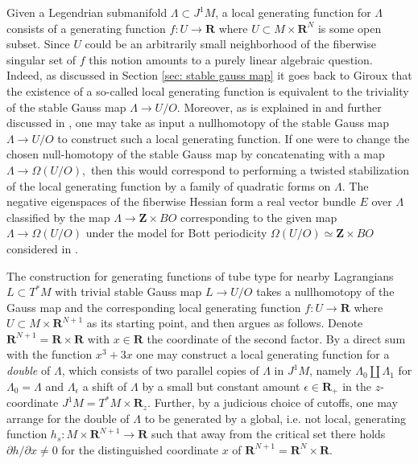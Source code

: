 \documentclass{amsart}
\def\bR{\mathbf{R}}
\def\bZ{\mathbf{Z}}
\theoremstyle{definition}
\theoremstyle{remark}
\newtheorem{inductive lemma}[theorem]{Inductive Lemma}
\begin{document}
Given a Legendrian submanifold $\Lambda \subset J^1M$, a local generating function for $\Lambda$ consists of a generating function $f:U \to \bR$ where $U \subset M \times \bR^N$ is some open subset. Since $U$ could be an arbitrarily small neighborhood of the fiberwise singular set of $f$ this notion amounts to a purely linear algebraic question. Indeed, as discussed in Section \ref{sec: stable gauss map} it goes back to Giroux \cite{G90} that the existence of a so-called local generating function is equivalent to the triviality of the stable Gauss map $\Lambda \to U/O$. Moreover, as is explained in \cite{G90} and further discussed in \cite{ACGK}, one may take as input a nullhomotopy of the stable Gauss map $\Lambda \to U/O$ to construct such a local generating function. If one were to change the chosen null-homotopy of the stable Gauss map by concatenating with a map $\Lambda \to \Omega (U/O),$ then this would correspond to performing a twisted stabilization of the local generating function by a family of quadratic forms on $\Lambda.$ The negative eigenspaces of the fiberwise Hessian form a real vector bundle $E$ over $\Lambda$ classified by the map $\Lambda \to \bZ \times BO$ corresponding to the given map $\Lambda \to \Omega (U/O)$ under the model for Bott periodicity $\Omega(U/O) \simeq \bZ \times BO$ considered in \cite{G90}. 

 The construction for generating functions of tube type for nearby Lagrangians $L \subset T^*M$ with trivial stable Gauss map $L \to U/O$ takes a nullhomotopy of the Gauss map and the corresponding local generating function $f:U \to \bR$ where $U \subset M \times \bR^{N+1}$ as its starting point, and then argues as follows. Denote $\bR^{N+1} = \bR \times \bR$ with $x \in \bR$ the coordinate of the second factor. By a direct sum with the function $x^3+3x$ one may construct a local generating function for a {\em double} of $\Lambda$, which consists of two parallel copies of $\Lambda$ in $J^1M$, namely $\Lambda_0 \coprod \Lambda_1$ for $\Lambda_0=\Lambda$ and $\Lambda_\epsilon$ a shift of $\Lambda$ by a small but constant amount $\epsilon \in \bR_+$ in the $z$-coordinate $J^1M=T^*M \times \bR_z$. Further, by a judicious choice of cutoffs, one may arrange for the double of $\Lambda$ to be generated by a global, i.e. not local, generating function $h_s:M \times \bR^{N+1} \to \bR$ such that away from the critical set there holds $\partial h/ \partial x \neq 0$ for the distinguished coordinate $x$ of $\bR^{N+1}=\bR^N \times \bR$. 
\end{document}
